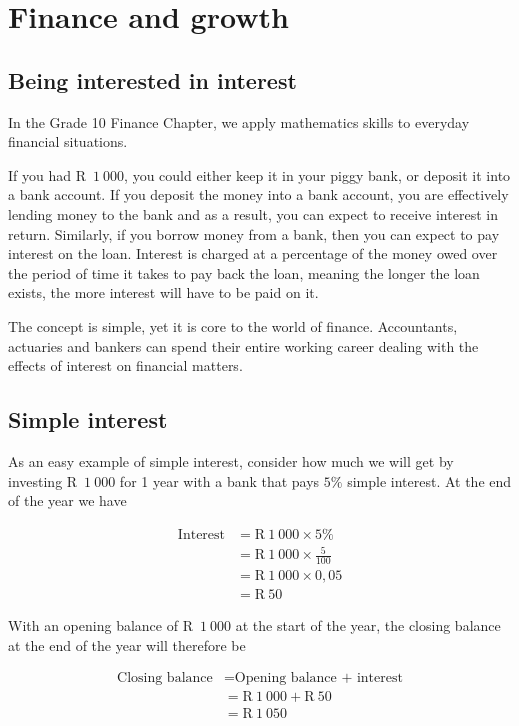 \chapter{Finance and growth}

\section{Being interested in interest}

In the Grade 10 Finance Chapter, we apply mathematics skills to everyday financial situations.\par

If you had R~$1 ~000$, you could either keep it in your piggy bank, or deposit it into a bank account. If you deposit the
money into a bank account, you are effectively lending money to the bank and as a result, you can expect to receive
interest in return. Similarly, if you borrow money from a bank, then you can expect to pay interest on the loan.
Interest is charged at a percentage of the money owed over the period of time it takes to pay back the loan, meaning
the longer the loan exists, the more interest will have to be paid on it.\par

The concept is simple, yet it is core to the world of finance. Accountants, actuaries and bankers can spend their
entire working career dealing with the effects of interest on financial matters.\par
{}
\section{Simple interest}
  
As an easy example of simple interest, consider how much we will get by investing R~$1~000$ for 1 year with a bank that pays $5\%$ simple interest. At the end of the year we have\par
\begin{align*}
    \mbox{Interest} &= \text{R}~1~000 \times 5\%\\
    &= \text{R}~1~000 \times \frac{5}{100}\\
    &= \text{R}~1~000 \times 0,05\\
    &= \text{R}~50
\end{align*}

With an opening balance of R~$1~000$ at the start of the year, the closing balance at the end of the year will therefore be\par 
\begin{align*}
    \mbox{Closing balance} &= \mbox{Opening balance + interest}\\
    &= \text{R}~1~000 + \text{R}~50\\
    &= \text{R}~1~050
\end{align*}

